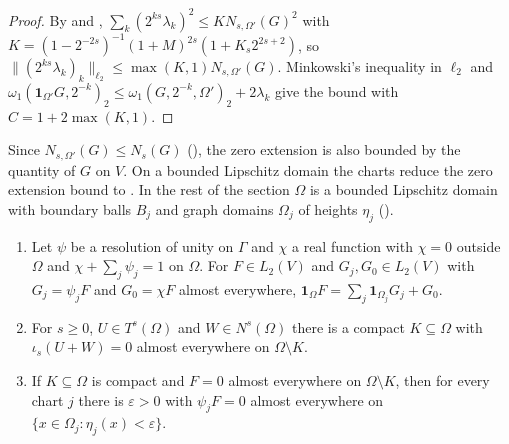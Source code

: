 \begin{proof}
\leanok
{}
By  and ,
$\sum_k (2^{ks} \lambda_k)^2 \leq K N_{s,\Omega'}(G)^2$ with
$K = (1 - 2^{-2s})^{-1} (1 + M)^{2s} (1 + K_s 2^{2s+2})$, so
$\|(2^{ks} \lambda_k)_k\|_{\ell_2} \leq \max(K, 1) N_{s,\Omega'}(G)$. Minkowski's inequality in
$\ell_2$ and $\omega_1(\mathbf 1_{\Omega'} G, 2^{-k})_2 \leq \omega_1(G, 2^{-k}, \Omega')_2 +
2 \lambda_k$ give the bound with $C = 1 + 2 \max(K, 1)$.
\end{proof}

Since $N_{s,\Omega'}(G) \leq N_s(G)$ (), the zero extension is also
bounded by the quantity of $G$ on $V$. On a bounded Lipschitz domain the charts reduce the zero
extension bound to . In the rest of the section $\Omega$ is a
bounded Lipschitz domain with boundary balls $B_j$ and graph domains $\Omega_j$ of heights
$\eta_j$ ().

\begin{lemma}
\label{lem:zero-extension-charts}
\leanok
{}
\begin{enumerate}
  \item Let $\psi$ be a resolution of unity on $\Gamma$ and $\chi$ a real function with $\chi = 0$
  outside $\Omega$ and $\chi + \sum_j \psi_j = 1$ on $\Omega$. For $F \in L_2(V)$ and
  $G_j, G_0 \in L_2(V)$ with $G_j = \psi_j F$ and $G_0 = \chi F$ almost everywhere,
  $\mathbf 1_\Omega F = \sum_j \mathbf 1_{\Omega_j} G_j + G_0$.
  \item For $s \geq 0$, $U \in T^s(\Omega)$ and $W \in N^s(\Omega)$ there is a compact
  $K \subseteq \Omega$ with $\iota_s(U + W) = 0$ almost everywhere on $\Omega \setminus K$.
  \item If $K \subseteq \Omega$ is compact and $F = 0$ almost everywhere on $\Omega \setminus K$,
  then for every chart $j$ there is $\varepsilon > 0$ with $\psi_j F = 0$ almost everywhere on
  $\{x \in \Omega_j : \eta_j(x) < \varepsilon\}$.
\end{enumerate}
\end{lemma}

